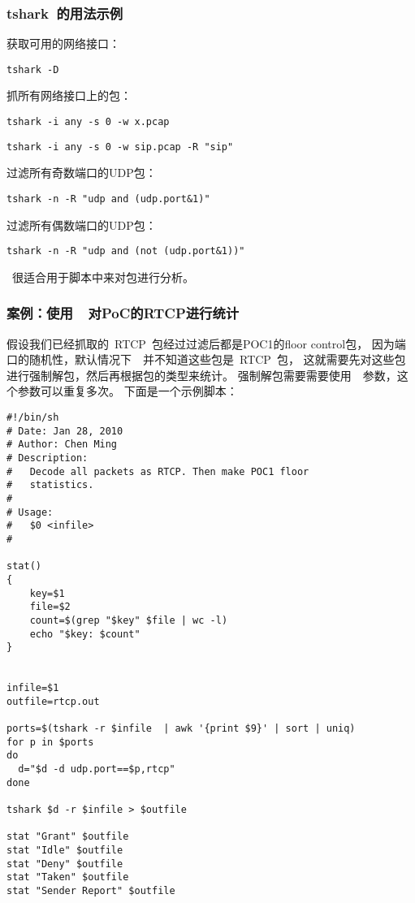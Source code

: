 \noindent
{}


\noindent
{}


\noindent
{}



\subsubsection{tshark~的用法示例}
获取可用的网络接口：
\begin{lstlisting}
tshark -D
\end{lstlisting}


抓所有网络接口上的包：
\begin{lstlisting}
tshark -i any -s 0 -w x.pcap
\end{lstlisting}

\begin{lstlisting}
tshark -i any -s 0 -w sip.pcap -R "sip"
\end{lstlisting}


过滤所有奇数端口的UDP包：
\begin{lstlisting}
tshark -n -R "udp and (udp.port&1)"
\end{lstlisting}

过滤所有偶数端口的UDP包：
\begin{lstlisting}
tshark -n -R "udp and (not (udp.port&1))"
\end{lstlisting}

~很适合用于脚本中来对包进行分析。

\subsubsection{案例：使用~~对PoC的RTCP进行统计}
假设我们已经抓取的~RTCP~包经过过滤后都是POC1的floor control包，
因为端口的随机性，默认情况下~~并不知道这些包是~RTCP~包，
这就需要先对这些包进行强制解包，然后再根据包的类型来统计。
强制解包需要需要使用~~参数，这个参数可以重复多次。
下面是一个示例脚本：

\begin{lstlisting}
#!/bin/sh
# Date: Jan 28, 2010
# Author: Chen Ming
# Description:
#   Decode all packets as RTCP. Then make POC1 floor
#   statistics.
#
# Usage:
#   $0 <infile>
#

stat()
{
    key=$1
    file=$2
    count=$(grep "$key" $file | wc -l)
    echo "$key: $count"
}


infile=$1
outfile=rtcp.out

ports=$(tshark -r $infile  | awk '{print $9}' | sort | uniq)
for p in $ports
do
  d="$d -d udp.port==$p,rtcp"
done

tshark $d -r $infile > $outfile

stat "Grant" $outfile
stat "Idle" $outfile
stat "Deny" $outfile
stat "Taken" $outfile
stat "Sender Report" $outfile
\end{lstlisting}

